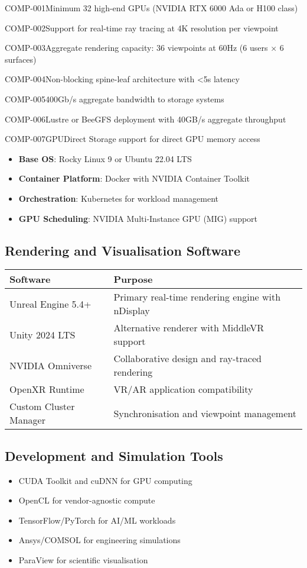 \begin{requirement}{COMP-001}{Minimum 32 high-end GPUs (NVIDIA RTX 6000 Ada or H100 class)}
\begin{requirement}{COMP-002}{Support for real-time ray tracing at 4K resolution per viewpoint}
\begin{requirement}{COMP-003}{Aggregate rendering capacity: 36 viewpoints at 60Hz (6 users × 6 surfaces)}
\begin{requirement}{COMP-004}{Non-blocking spine-leaf architecture with <5\textmu s latency}
\begin{requirement}{COMP-005}{400Gb/s aggregate bandwidth to storage systems}
\begin{requirement}{COMP-006}{Lustre or BeeGFS deployment with 40GB/s aggregate throughput}
\begin{requirement}{COMP-007}{GPUDirect Storage support for direct GPU memory access}
\begin{itemize}
    \item \textbf{Base OS}: Rocky Linux 9 or Ubuntu 22.04 LTS
    \item \textbf{Container Platform}: Docker with NVIDIA Container Toolkit
    \item \textbf{Orchestration}: Kubernetes for workload management
    \item \textbf{GPU Scheduling}: NVIDIA Multi-Instance GPU (MIG) support
\end{itemize}

\subsection{Rendering and Visualisation Software}

\begin{table}[H]
\centering
\begin{tabularx}{\textwidth}{@{}lX@{}}
\toprule
\textbf{Software} & \textbf{Purpose} \\
\midrule
Unreal Engine 5.4+ & Primary real-time rendering engine with nDisplay \\
Unity 2024 LTS & Alternative renderer with MiddleVR support \\
NVIDIA Omniverse & Collaborative design and ray-traced rendering \\
OpenXR Runtime & VR/AR application compatibility \\
Custom Cluster Manager & Synchronisation and viewpoint management \\
\bottomrule
\end{tabularx}
\end{table}

\subsection{Development and Simulation Tools}

\begin{itemize}
    \item CUDA Toolkit and cuDNN for GPU computing
    \item OpenCL for vendor-agnostic compute
    \item TensorFlow/PyTorch for AI/ML workloads
    \item Ansys/COMSOL for engineering simulations
    \item ParaView for scientific visualisation
\end{itemize}


\end{requirement}
\end{requirement}
\end{requirement}
\end{requirement}
\end{requirement}
\end{requirement}
\end{requirement}
